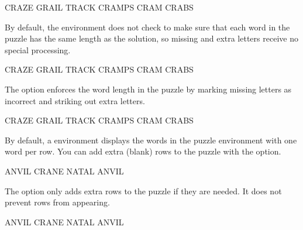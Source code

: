 \documentclass[svgnames]{report}
\begin{document}

  \begin{example}
    \begin{wordle}[letters=false]{CRAZE}
      GRAIL
      TRACK
      CRAMPS
      CRAM
      CRABS
    \end{wordle}
  \end{example}


  By default, the  environment does not check to make
  sure that each word in the puzzle has the same length as the solution,
  so missing and extra letters receive no special processing.

  \begin{example}
    \begin{wordle}{CRAZE}
      GRAIL
      TRACK
      CRAMPS
      CRAM
      CRABS
    \end{wordle}
  \end{example}

  The  option enforces the word length in the puzzle by
  marking missing letters as incorrect and striking out extra letters.

  \begin{example}
    \begin{wordle}[strict]{CRAZE}
      GRAIL
      TRACK
      CRAMPS
      CRAM
      CRABS
    \end{wordle}
  \end{example}

  By default, a  environment displays the words
  in the puzzle environment with one word per row. You can add extra
  (blank) rows to the puzzle with the  option.


  \begin{example}
    \begin{wordle}[rows=4]{ANVIL}
      CRANE
      NATAL
      ANVIL
    \end{wordle}
  \end{example}

  The  option only adds extra rows to the puzzle if they are
  needed. It does not prevent rows from appearing.

  \begin{example}
    \begin{wordle}[rows=2]{ANVIL}
      CRANE
      NATAL
      ANVIL
    \end{wordle}
  \end{example}
\end{document}
